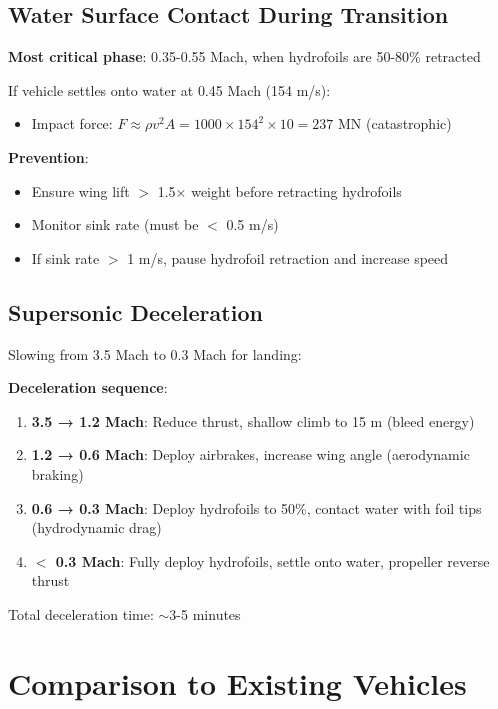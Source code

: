 \documentclass[12pt,a4paper]{article}
\begin{document}
\subsection{Water Surface Contact During Transition}

\textbf{Most critical phase}: 0.35-0.55 Mach, when hydrofoils are 50-80\% retracted

If vehicle settles onto water at 0.45 Mach (154 m/s):
\begin{itemize}
\item Impact force: $F \approx \rho v^2 A = 1000 \times 154^2 \times 10 = 237 \text{ MN}$ (catastrophic)
\end{itemize}

\textbf{Prevention}:
\begin{itemize}
\item Ensure wing lift $>$ 1.5× weight before retracting hydrofoils
\item Monitor sink rate (must be $<$ 0.5 m/s)
\item If sink rate $>$ 1 m/s, pause hydrofoil retraction and increase speed
\end{itemize}

\subsection{Supersonic Deceleration}

Slowing from 3.5 Mach to 0.3 Mach for landing:

\textbf{Deceleration sequence}:
\begin{enumerate}
\item \textbf{3.5 → 1.2 Mach}: Reduce thrust, shallow climb to 15 m (bleed energy)
\item \textbf{1.2 → 0.6 Mach}: Deploy airbrakes, increase wing angle (aerodynamic braking)
\item \textbf{0.6 → 0.3 Mach}: Deploy hydrofoils to 50\%, contact water with foil tips (hydrodynamic drag)
\item \textbf{$<$ 0.3 Mach}: Fully deploy hydrofoils, settle onto water, propeller reverse thrust
\end{enumerate}

Total deceleration time: $\sim$3-5 minutes

\section{Comparison to Existing Vehicles}
\end{document}
